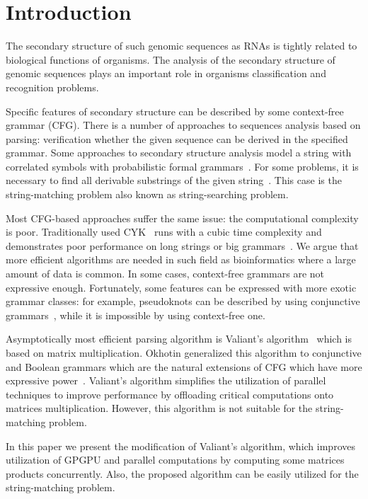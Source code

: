 \section{\bf Introduction}

The secondary structure of such genomic sequences as RNAs is tightly related to biological functions of organisms.
The analysis of the secondary structure of genomic sequences plays an important role in organisms classification and recognition problems.

Specific features of secondary structure can be described by some context-free grammar (CFG).
There is a number of approaches to sequences analysis based on parsing: verification whether the given sequence can be derived in the specified grammar.
Some approaches to secondary structure analysis model a string with correlated symbols with probabilistic formal grammars~\cite{knudsen1999rna, dowell2004evaluation}.
For some problems, it is necessary to find all derivable substrings of the given string~\cite{durbin1996biological}.
This case is the string-matching problem also known as string-searching problem.

Most CFG-based approaches suffer the same issue: the computational complexity is poor.
Traditionally used CYK~\cite{kasami1966efficient, Younger:1966:CLP:1441427.1442019} runs with a cubic time complexity and demonstrates poor performance on long strings or big grammars~\cite{liu2005parallel}.
We argue that more efficient algorithms are needed in such field as bioinformatics where a large amount of data is common.
In some cases, context-free grammars are not expressive enough.
Fortunately, some features can be expressed with more exotic grammar classes:  for example, pseudoknots can be described by using conjunctive grammars~\cite{zier2013rna}, while it is impossible by using context-free one.

Asymptotically most efficient parsing algorithm is Valiant's algorithm~\cite{Valiant:1975:GCR:1739932.1740048} which is based on matrix multiplication.
Okhotin generalized this algorithm to conjunctive and Boolean grammars which are the natural extensions of CFG which have more expressive power~\cite{Okhotin:2014:PMM:2565359.2565379}.
Valiant’s algorithm simplifies the utilization of parallel techniques to improve performance by offloading critical computations onto matrices multiplication.
However, this algorithm is not suitable for the string-matching problem.

In this paper we present the modification of Valiant's algorithm, which improves utilization of GPGPU and parallel computations by computing some matrices products concurrently.
Also, the proposed algorithm can be easily utilized for the string-matching problem.
